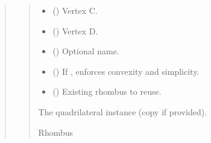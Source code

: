 \documentclass[letterpaper,10pt,english]{sphinxmanual}
\begin{document}
\begin{quote}
\begin{fulllineitems}
\begin{fulllineitems}
\begin{quote}
\begin{description}
\begin{itemize}
\item {} 
\sphinxAtStartPar
{} (\sphinxstyleliteralemphasis{\sphinxupquote{ | }}) \textendash{} Vertex C.

\item {} 
\sphinxAtStartPar
{} (\sphinxstyleliteralemphasis{\sphinxupquote{ | }}) \textendash{} Vertex D.

\item {} 
\sphinxAtStartPar
{} (\sphinxstyleliteralemphasis{\sphinxupquote{ | }}) \textendash{} Optional name.

\item {} 
\sphinxAtStartPar
{} () \textendash{} If , enforces convexity and simplicity.

\item {} 
\sphinxAtStartPar
{} (\sphinxstyleliteralemphasis{\sphinxupquote{ | }}) \textendash{} Existing rhombus to reuse.

\end{itemize}

\sphinxAtStartPar
The quadrilateral instance (copy if provided).

\sphinxAtStartPar
Rhombus

\end{description}\end{quote}

\end{fulllineitems}



\end{fulllineitems}
\end{quote}
\end{document}
